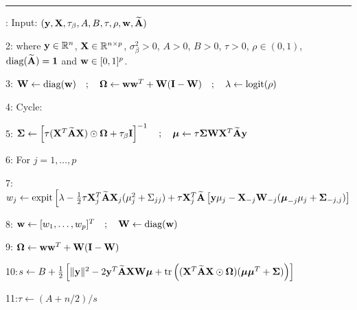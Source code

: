 \documentclass[11pt]{article}
\newtheorem{Main Result}{Main Result}
\def\vectorfontone{\bf}
\def\vectorfonttwo{\boldsymbol}
\def\vw{{\vectorfontone w}}                      %
\def\vy{{\vectorfontone y}}                      %
\def\vmu{{\vectorfonttwo \mu}}                   %
\def\matrixfontone{\bf}
\def\matrixfonttwo{\boldsymbol}
\def\mA{{\matrixfontone A}}                      %
\def\mI{{\matrixfontone I}}                      %
\def\mW{{\matrixfontone W}}                      %
\def\mX{{\matrixfontone X}}                      %
\def\mSigma{{\matrixfonttwo \Sigma}}             %
\def\mOmega{{\matrixfonttwo \Omega}}             %
\def\bR{{\mathbb R}}                             %
\def\tr{\text{tr}}
\DeclareMathOperator{\expit}{expit}
\begin{document}
\begin{algorithm}
	\begin{minipage}[h]{\textwidth}
		\hrule
		\vskip2mm: Input: $(\vy,\mX,\tau_{\beta},A,B,\tau,\rho,\vw,\widetilde{\mA})$ 
		
		2: where $\vy\in\bR^n$, $\mX\in\bR^{n\times p}$, $\sigma_{\beta}^2>0$,
		$A>0$, $B>0$, $\tau>0$, $\rho\in(0,1)$, $\mbox{diag}(\widetilde{\mA})=\mathbf{1}$ and $\vw \in [0,1]^p$. 
		
		3: $\mW \leftarrow \mbox{diag}(\vw)
		\quad ; \quad
		\mOmega \leftarrow \vw\vw^{T} + \mW(\mI - \mW)
		\quad ; \quad
		\lambda \leftarrow \mbox{logit}(\rho)
		$ 
		
		4: Cycle:
		
		\vspace{1mm}
		5:\hspace{8mm} $\mSigma
		\leftarrow
		\left[\tau (\mX^T\widetilde{\mA}\mX)\odot\mOmega + \tau_\beta\mI\right]^{-1}
		\quad ; \quad
		\vmu \leftarrow \tau\mSigma\mW\mX^T\widetilde{\mA}\vy$
		
		\vspace{1mm}
		6:\hspace{8mm} For $j=1,\ldots,p$
		
		\vspace{1mm}
		7:\hspace{16mm} $w_j \leftarrow
		\expit\Big[\lambda -\frac{1}{2}\tau\mX_j^T\widetilde{\mA}\mX_j(\mu_j^2+\Sigma_{jj})
		+ \tau\mX^T_j\widetilde{\mA}\left[\vy\mu_j-\mX_{-j}\mW_{-j}(\vmu_{-j}\mu_j + \mSigma_{-j,j})\right]  $
		
		\vspace{1mm}
		8:\hspace{16mm} $\vw \leftarrow [w_1,\ldots,w_p]^{T}
		\quad ; \quad
		\mW \leftarrow \mbox{diag}(\vw)$
		
		\vspace{1mm}
		9:\hspace{8mm} $\mOmega \leftarrow \vw\vw^{T} + \mW(\mI - \mW)$
		
		\vspace{1mm}
		10:\hspace{8mm}$s \leftarrow
		B + \frac{1}{2}\left[
		\|\vy\|^2 - 2\vy^T\widetilde{\mA}\mX\mW\vmu
		+\tr\left( (\mX^T\widetilde{\mA}\mX\odot\mOmega)(\vmu\vmu^T + \mSigma) \right)\right]$
		
		\vspace{1mm}
		11:\hspace{8mm}$\tau \leftarrow (A+n/2)/s$
		

\end{minipage}
\end{algorithm}
\end{document}
